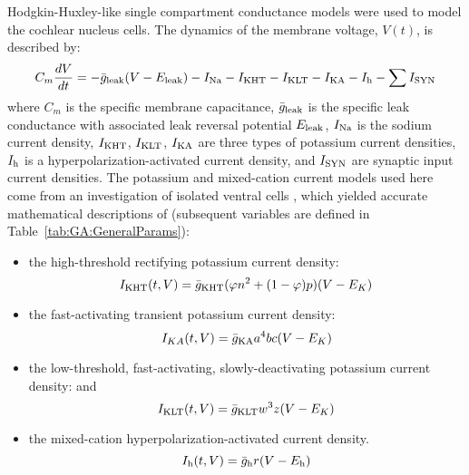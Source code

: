 Hodgkin-Huxley-like single compartment conductance models
\citep{HodgkinHuxley:1952a} were used to model the cochlear nucleus
cells. The dynamics of the membrane voltage, $V(t)$, is described by:
\begin{equation} \label{eq:GA:5} 
C_{m} \frac{dV}{dt} =-\bar{g}_{{\rm
      leak}} (V-E_{{\rm leak}} )-I_{{\rm Na}} -I_{{\rm KHT}} -I_{{\rm
      KLT}} -I_{{\rm KA}} -I_{{\rm h}} -\sum I_{{\rm SYN}}
\end{equation}
\noindent where $C_{m}$ is the specific membrane capacitance,
$\bar{g}_{{\rm leak}} $ is the specific leak conductance with
associated leak reversal potential $E_{{\rm leak}} $, $I_{{\rm Na}} $
is the sodium current density, $I_{{\rm KHT}} $, $I_{{\rm KLT}} $,
$I_{{\rm KA}} $ are three types of potassium current densities,
$I_{{\rm h}} $ is a hyperpolarization-activated current density, and
$I_{{\rm SYN}} $ are synaptic input current densities.  The potassium
and mixed-cation current models used here come from an investigation
of isolated ventral {\CN} cells
\citep{RothmanManis:2003,RothmanManis:2003a,RothmanManis:2003b}, which
yielded accurate mathematical descriptions of (subsequent variables
are defined in Table~\ref{tab:GA:GeneralParams}):
\begin{itemize}
\item the high-threshold rectifying potassium current density:
  \begin{equation} \label{eq:GA:6} 
I_{{\rm KHT}}(t,V)=\bar{g}_{{\rm KHT}} (\varphi n^{2} + (1-\varphi ) p)(V-E_{K} )
  \end{equation}
\item the fast-activating transient potassium current density:
  \begin{equation} \label{eq:GA:7} 
I_{KA} (t,V)=\bar{g}_{{\rm KA}} a^{4} b c (V-E_{K})
  \end{equation}
\item the low-threshold, fast-activating, slowly-deactivating
  potassium current density: and
  \begin{equation} \label{eq:GA:8} 
I_{{\rm KLT}}(t,V)=\bar{g}_{{\rm KLT}} w^{3} z (V-E_{K} )
  \end{equation}
\item the mixed-cation hyperpolarization-activated current density.
  \begin{equation} \label{eq:GA:9} 
I_{{\rm h}} (t,V)=\bar{g}_{{\rm h}} r (V-E_{{\rm h}} )
  \end{equation}
\end{itemize}

